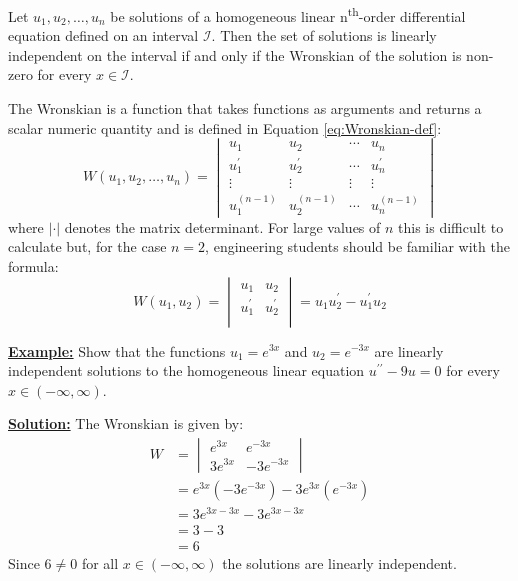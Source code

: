 \begin{theorem}
Let $u_1,u_2,\dots,u_n$ be solutions of a homogeneous linear n\textsuperscript{th}-order differential equation defined on an interval $\mathcal{I}$.  Then the set of solutions is linearly independent on the interval if and only if the Wronskian of the solution is non-zero for every $x \in \mathcal{I}$.  
\end{theorem}
The Wronskian is a function that takes functions as arguments and returns a scalar numeric quantity and is defined in Equation \ref{eq:Wronskian-def}:\begin{equation}
W(u_1,u_2,\dots,u_n)=
\begin{vmatrix}
u_1 & u_2 & \cdots & u_n \\
u^{\prime}_1 & u^{\prime}_2 & \cdots & u^{\prime}_n \\
\vdots & \vdots & \vdots & \vdots \\
u^{(n-1)}_1 & u^{(n-1)}_2 & \cdots & u^{(n-1)}_n
\end{vmatrix}
\label{eq:Wronskian-def}
\end{equation}
where $|\cdot|$ denotes the matrix determinant.  For large values of $n$ this is difficult to calculate but, for the case $n=2$, engineering students should be familiar with the formula:
\begin{equation}
W(u_1,u_2) = 
\begin{vmatrix}
u_1 & u_2 \\
u^{\prime}_1 & u^{\prime}_2 \\
\end{vmatrix}
= u_1 u^{\prime}_2 - u^{\prime}_1 u_2
\end{equation}

\vspace{0.5cm}

\noindent\textbf{\underline{Example:}} Show that the functions $u_1 = e^{3x}$ and $u_2=e^{-3x}$ are linearly independent solutions to the homogeneous linear equation $u^{\prime \prime}-9u=0$ for every $x \in (-\infty,\infty)$.

\noindent\textbf{\underline{Solution:}} The Wronskian is given by:
\begin{align*}
W &= 
\begin{vmatrix}
e^{3x} & e^{-3x} \\
3e^{3x} & -3e^{-3x}
\end{vmatrix} \\
&= e^{3x}\left(-3e^{-3x}\right) - 3e^{3x}\left(e^{-3x}\right) \\
&= 3e^{3x-3x} - 3e^{3x-3x} \\
&= 3 - 3 \\
&= 6
\end{align*}
\noindent Since $6 \ne 0$ for all $x \in (-\infty,\infty)$ the solutions are linearly independent.

